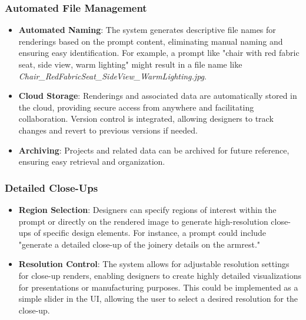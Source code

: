 \subsubsection{Automated File Management}
\begin{itemize}
\item \textbf{Automated Naming}: The system generates descriptive file names for renderings based on the prompt content, eliminating manual naming and ensuring easy identification. For example, a prompt like "chair with red fabric seat, side view, warm lighting" might result in a file name like \textit{Chair_RedFabricSeat_SideView_WarmLighting.jpg}.
\item \textbf{Cloud Storage}: Renderings and associated data are automatically stored in the cloud, providing secure access from anywhere and facilitating collaboration. Version control is integrated, allowing designers to track changes and revert to previous versions if needed.
\item \textbf{Archiving}: Projects and related data can be archived for future reference, ensuring easy retrieval and organization.
\end{itemize}

\subsubsection{Detailed Close-Ups}
\begin{itemize}
\item \textbf{Region Selection}: Designers can specify regions of interest within the prompt or directly on the rendered image to generate high-resolution close-ups of specific design elements. For instance, a prompt could include "generate a detailed close-up of the joinery details on the armrest."
\item \textbf{Resolution Control}: The system allows for adjustable resolution settings for close-up renders, enabling designers to create highly detailed visualizations for presentations or manufacturing purposes. This could be implemented as a simple slider in the UI, allowing the user to select a desired resolution for the close-up.
\end{itemize}

